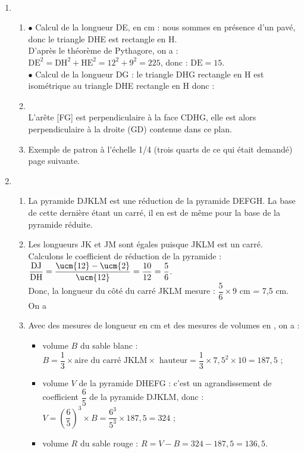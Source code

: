 \ \\ [-5mm]
\begin{enumerate}
   \item
   \begin{enumerate}
      \item $\bullet$ Calcul de la longueur DE, en cm : nous sommes en présence d'un pavé, donc le triangle DHE est rectangle en H. \\
      D'après le théorème de Pythagore, on a : $\text{DE}^2 =\text{DH}^2+\text{HE}^2 =12^2+9^2 =225$, donc : $\text{DE} =15$. \\
      $\bullet$ Calcul de la longueur DG : le triangle DHG rectangle en H est isométrique au triangle DHE rectangle en H donc : 
      \item {} \\
      L'arête [FG] est perpendiculaire à la face CDHG, elle est alors perpendiculaire à la droite (GD) contenue dans ce plan.
      \item Exemple de patron à l'échelle 1/4 (trois quarts de ce qui était demandé) page suivante.
   \end{enumerate}
   \item
   \begin{enumerate}
      \item La pyramide DJKLM est une réduction de la pyramide DEFGH. La base de cette dernière étant un carré, il en est de même pour la base de la pyramide réduite. 
      \item Les longueurs JK et JM sont égales puisque JKLM est un carré. \\
   Calculons le coefficient de réduction de la pyramide : $\dfrac{\text{DJ}}{\text{DH}} =\dfrac{\ucm{12}-\ucm{2}}{\ucm{12}} =\dfrac{10}{12} =\dfrac56$. \\
   Donc, la longueur du côté du carré JKLM mesure : $\dfrac56\times9$ cm  = 7,5 cm. On a 
      \item Avec des mesures de longueur en cm et des mesures de volumes en \ucmc{}, on a :
      \begin{itemize}
         \item volume $B$ du sable blanc : $B =\dfrac13\times\text{aire du carré JKLM}\times\text{ hauteur} =\dfrac13\times7,5^2\times10 =187,5$ ;
         \item volume $V$ de la pyramide DHEFG : c'est un agrandissement de coefficient $\dfrac65$ de la pyramide DJKLM, donc : $V =\left(\dfrac65\right)^3\times B =\dfrac{6^3}{5^3}\times187,5 =324$ ;
         \item volume $R$ du sable rouge : $R =V-B =324-187,5 =136,5$.
      \end{itemize}
   \end{enumerate}
\end{enumerate}

